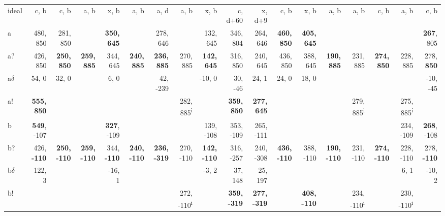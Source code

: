 \begin{table}[p]
{\begin{tabular}{lrrrrrrrrrrrrrrrrr}
ideal & c, b & c, b & a, b & x, b & a, b & a, d & a, b & x, b & c, d+60 & x, d+9 & c, b & x, b & a, b & a, b & c, b & a, b & c, b \\
a & 480, 850 & 281, 850 &  & \textbf{350, 645} &  & 278, 646 &  & 132, 645 & 346, 804 & 264, 646 & \textbf{460, 850} & \textbf{405, 645} &  &  &  &  & \textbf{267}, 805 \\
a? & 426, 850 & \textbf{250, 850} & \textbf{259, 885} & 344, 645 & \textbf{240, 885} & \textbf{236, 885} & 270, 885 & \textbf{142, 645} & 316, 850 & 240, 645 & 436, 850 & 388, 645 & \textbf{190, 885} & 231, 885 & \textbf{274, 850} & 228, 885 & 278, \textbf{850} \\
a$\delta$ & 54, 0 & 32, 0 &  & 6, 0 &  & 42, -239 &  & -10, 0 & 30, -46 & 24, 1 & 24, 0 & 18, 0 &  &  &  &  & -10, -45 \\
a! & \textbf{555, 850} &  &  &  &  &  & 282, 885\textsuperscript{i} &  & \textbf{359, 850} & \textbf{277, 645} &  &  &  & 279, 885\textsuperscript{i} &  & 275, 885\textsuperscript{i} &  \\
b & \textbf{549}, -107 &  &  & \textbf{327}, -109 &  &  &  & 139, -108 & 353, -109 & 265, -111 &  &  &  &  &  & 234, -109 & \textbf{268}, -108 \\
b? & 426, \textbf{-110} & \textbf{250, -110} & \textbf{259, -110} & 344, \textbf{-110} & \textbf{240, -110} & \textbf{236, -319} & 270, -110 & \textbf{142, -110} & 316, -257 & 240, -308 & \textbf{436, -110} & 388, -110 & \textbf{190, -110} & 231, -110 & \textbf{274, -110} & 228, -110 & 278, \textbf{-110} \\
b$\delta$ & 122, 3 &  &  & -16, 1 &  &  &  & -3, 2 & 37, 148 & 25, 197 &  &  &  &  &  & 6, 1 & -10, 2 \\
b! &  &  &  &  &  &  & 272, -110\textsuperscript{i} &  & \textbf{359, -319} & \textbf{277, -319} &  & \textbf{408, -110} &  & 234, -110\textsuperscript{i} &  & 230, -110\textsuperscript{i} &  \\

\end{tabular}}
\end{table}
